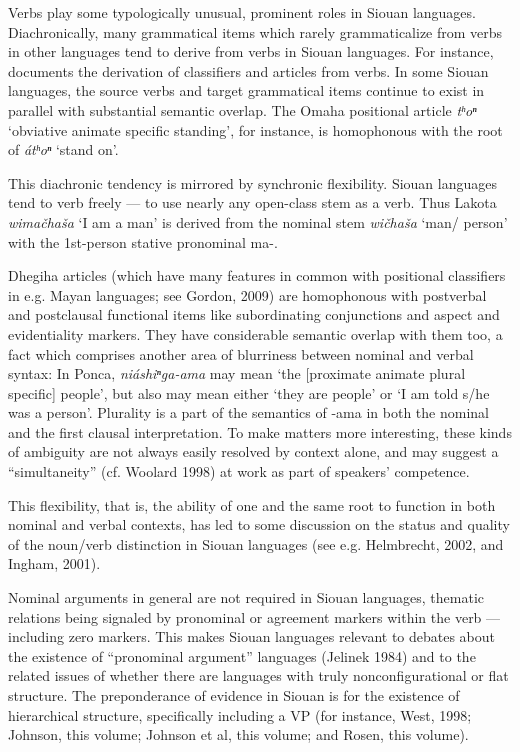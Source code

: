 \begin{refsection}
Verbs play some typologically unusual, prominent roles in Siouan languages. Diachronically, many grammatical items which rarely grammaticalize from verbs in other languages tend to derive from verbs in Siouan languages. For instance, \citet{Rankin1977} documents the derivation of classifiers and articles from verbs. In some Siouan languages, the source verbs and target grammatical items continue to exist in parallel with substantial semantic overlap. The Omaha positional article \textit{tʰoⁿ} `obviative animate specific standing', for instance, is homophonous with the root of \textit{\'atʰoⁿ} `stand on'.


This diachronic tendency is mirrored by synchronic flexibility. Siouan languages tend to verb freely --- to use nearly any open-class stem as a verb. Thus Lakota \textit{wima\v{c}ha\v{s}a} `I am a man' is derived from the nominal stem \textit{wi\v{c}ha\v{s}a} `man/ person' with the 1st-person stative pronominal ma-.

Dhegiha articles (which have many features in common with positional classifiers in e.g. Mayan languages; see Gordon, 2009) are homophonous with postverbal and postclausal functional items like subordinating conjunctions and aspect and evidentiality markers. They have considerable semantic overlap with them too, a fact which comprises another area of blurriness between nominal and verbal syntax: In Ponca, \textit{ni\'ashiⁿga-ama} may mean `the [proximate animate plural specific] people', but also may mean either `they are people' or `I am told s/he was a person'. Plurality is a part of the semantics of -ama in both the nominal and the first clausal interpretation. To make matters more interesting, these kinds of ambiguity are not always easily resolved by context alone, and may suggest a ``simultaneity'' (cf. Woolard 1998) at work as part of speakers' competence. 


This flexibility, that is, the ability of one and the same root to function in both nominal and verbal contexts, has led to some discussion on the status and quality of the noun/verb distinction in Siouan languages (see e.g. Helmbrecht, 2002, and Ingham, 2001). 

Nominal arguments in general are not required in Siouan languages, thematic relations being signaled by pronominal or agreement markers within the verb --- including zero markers. This makes Siouan languages relevant to debates about the existence of ``pronominal argument'' languages (Jelinek 1984) and to the related issues of whether there are languages with truly nonconfigurational or flat structure. The preponderance of evidence in Siouan is for the existence of hierarchical structure, specifically including a VP (for instance, West, 1998; Johnson, this volume; Johnson et al, this volume; and Rosen, this volume).



\end{refsection}
